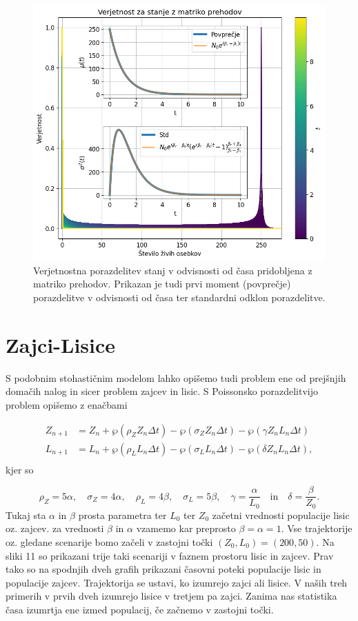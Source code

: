 \documentclass[slovene,11pt,a4paper]{article}
\begin{document}
\begin{figure}[h!]
\centering
\includegraphics[width=15cm]{slika10.png}
\caption{Verjetnostna porazdelitev stanj v odvisnosti od časa pridobljena z matriko prehodov. Prikazan je tudi prvi moment (povprečje) porazdelitve v odvisnosti od časa ter standardni odklon porazdelitve.}
\end{figure}

\section{Zajci-Lisice}

S podobnim stohastičnim modelom lahko opišemo tudi problem ene od prejšnjih domačih nalog in sicer problem zajcev in lisic. S Poissonsko porazdelitvijo problem opišemo z enačbami

\begin{align}
Z_{n+1} &= Z_n + \wp(\rho_Z Z_n \Delta t) - \wp(\sigma_Z Z_n \Delta t) - \wp (\gamma Z_n L_n \Delta t) \\
L_{n+1} &= L_n + \wp(\rho_L L_n \Delta t) - \wp(\sigma_L L_n \Delta t) - \wp (\delta Z_n L_n \Delta t), \\
\end{align}
kjer so 

\[
\rho_Z = 5\alpha, \quad \sigma_Z = 4\alpha, \quad \rho_L = 4\beta, \quad \sigma_L = 5\beta, \quad \gamma = \frac{\alpha}{L_0} \quad \text{in} \quad \delta = \frac{\beta}{Z_0}.
\]
Tukaj sta $\alpha$ in $\beta$ prosta parametra ter $L_0$ ter $Z_0$ začetni vrednosti populacije lisic oz. zajcev. za vrednosti $\beta$ in $\alpha$ vzamemo kar preprosto $\beta = \alpha = 1$. Vse trajektorije oz. gledane scenarije bomo začeli v zastojni točki $(Z_0, L_0)=(200, 50)$. Na sliki 11 so prikazani trije taki scenariji v faznem prostoru lisic in zajcev. Prav tako so na spodnjih dveh grafih prikazani časovni poteki populacije lisic in populacije zajcev. Trajektorija se ustavi, ko izumrejo zajci ali lisice. V naših treh primerih v prvih dveh izumrejo lisice v tretjem pa zajci. Zanima nas statistika časa izumrtja ene izmed populacij, če začnemo v zastojni točki.
\end{document}
